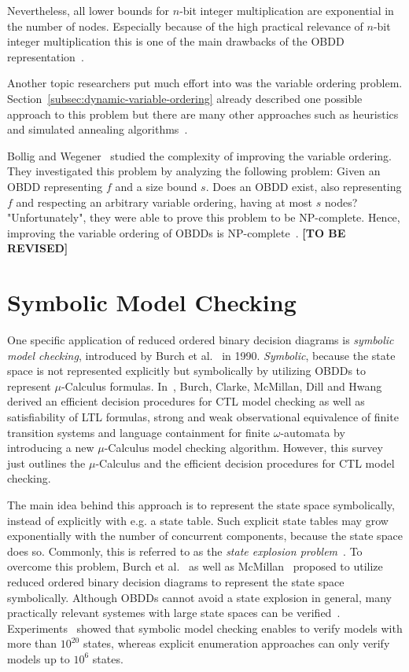 \documentclass{vldb}
\newcommand{\tbr}{\textbf{[TO BE REVISED]}}
\begin{document}
Nevertheless, all lower bounds for $n$-bit integer multiplication are exponential
in the number of nodes. Especially because of the high practical relevance of
$n$-bit integer multiplication this is one of the main drawbacks of the OBDD
representation~\cite{BRYANT86, BRYANT91, WOELFEL01}.

Another topic researchers put much effort into was the variable ordering problem.
Section~\ref{subsec:dynamic-variable-ordering} already described one possible
approach to this problem but there are many other approaches such as heuristics
and simulated annealing algorithms~\cite{BOLLIG96}.

Bollig and Wegener~\cite{BOLLIG96} studied the complexity of improving the
variable ordering. They investigated this problem by analyzing the following
problem: Given an OBDD representing $f$ and a size bound $s$. Does an OBDD exist,
also representing $f$ and respecting an arbitrary variable ordering, having at
most $s$ nodes? "Unfortunately", they were able to prove this problem to be 
NP-complete. Hence, improving the variable ordering of OBDDs is
NP-complete~\cite{BOLLIG96}. \tbr

\section{Symbolic Model Checking}
\label{sec:symbolic-model-checking}

One specific application of reduced ordered binary decision diagrams is 
\textit{symbolic model checking}, introduced by Burch et al.~\cite{BURCH90} in
1990. \textit{Symbolic}, because the state space is not represented explicitly
but symbolically by utilizing OBDDs to represent $\mu$-Calculus formulas.
In~\cite{BURCH90}, Burch, Clarke, McMillan, Dill and Hwang derived an efficient
decision procedures for CTL model checking as well as satisfiability of LTL
formulas, strong and weak observational equivalence of finite transition systems
and language containment for finite $\omega$-automata by introducing a new
$\mu$-Calculus model checking algorithm. However, this survey just outlines the
$\mu$-Calculus and the efficient decision procedures for CTL model checking.

The main idea behind this approach is to represent the state space symbolically,
instead of explicitly with e.g. a state table. Such explicit state tables may grow
exponentially with the number of concurrent components, because the state space
does so. Commonly, this is referred to as the
\textit{state explosion problem}~\cite{BURCH90, MCMILLAN92}. To overcome this
problem, Burch et al.~\cite{BURCH90} as well as McMillan~\cite{MCMILLAN92}
proposed to utilize reduced ordered binary decision diagrams to represent the 
state space symbolically. Although OBDDs cannot avoid a state explosion in general,
many practically relevant systemes with large state spaces can be
verified~\cite{BURCH90, MCMILLAN92}. Experiments~\cite{BURCH90} showed that
symbolic model checking enables to verify models with more than $10^{20}$ states,
whereas explicit enumeration approaches can only verify models up to $10^6$
states. 
\end{document}
